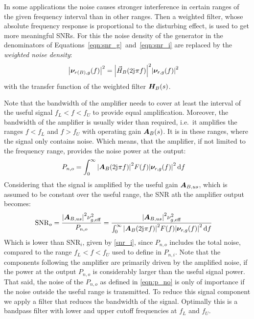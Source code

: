 In some applications the noise causes stronger interference in certain ranges of the given frequency interval than in other ranges. Then a weighted filter, whose absolute frequency response is proportional to the disturbing effect, is used to get more meaningful \ac{SNR}s. For this the noise density of the generator in the denominators of Equations~\ref{eqn:snr_g}~and~\ref{eqn:snr_i} are replaced by the \emph{weighted noise density}:
\begin{align}
  \abs{\bm{\nu}_{r(B),g}(f)}^2 &= \abs{\vec{H}_B(2\mathrm{j}\mkern1mu\pi f)}^2\abs{\bm{\nu}_{r,g}(f)}^2
\end{align}
with the transfer function of the weighted filter $\bm{H}_B(s)$.

Note that the bandwidth of the amplifier needs to cover at least the interval of the useful signal $f_L<f<f_U$ to provide equal amplification. Moreover, the bandwidth of the amplifier is usually wider than required, i.e.\ it amplifies the ranges $f<f_L$ and $f>f_U$ with operating gain $\bm{A}_B(s)$. It is in these ranges, where the signal only contains noise. Which means, that the amplifier, if not limited to the frequency range, provides the noise power at the output:
\begin{align}
  P_{n,o} &= \int_0^\infty \abs{\bm{A}_B(2\mathrm{j}\mkern1mu\pi f)}^2F(f)\abs{\bm{\nu}_{r,g}(f)}^2\dd{f} \label{eqn:p_no}
\end{align}
Considering that the signal is amplified by the useful gain $\bm{A}_{B,us}$, which is assumed to be constant over the useful range, the \ac{SNR} ath the amplifier output becomes:
\begin{align}
  \mathrm{SNR}_o &= \frac{\abs{\bm{A}_{B,us}}^2\nu_{g,\text{eff}}^2}{P_{n,o}} = \frac{\abs{\bm{A}_{B,us}}^2\nu_{g,\text{eff}}^2}{\int_0^\infty \abs{\bm{A}_B(2\mathrm{j}\mkern1mu\pi f)}^2F(f)\abs{\bm{\nu}_{r,g}(f)}^2\dd{f}}
\end{align}
Which is lower than $\mathrm{SNR}_i$, given by \eqref{snr_i}, since $P_{n,o}$ includes the total noise, compared to the range $f_L<f<f_U$ used to define in $P_{n,i}$. Note that the components following the amplifier are primarily driven by the amplified noise, if the power at the output $P_{n,o}$ is considerably larger than the useful signal power. That said, the noise of the $P_{n,o}$ as defined in \eqref{eqn:p_no} is only of importance if the noise outside the useful range is transmitted. To reduce this signal component we apply a filter that reduces the bandwidth of the signal. Optimally this is a bandpass filter with lower and upper cutoff frequencies at $f_L$ and $f_U$.

